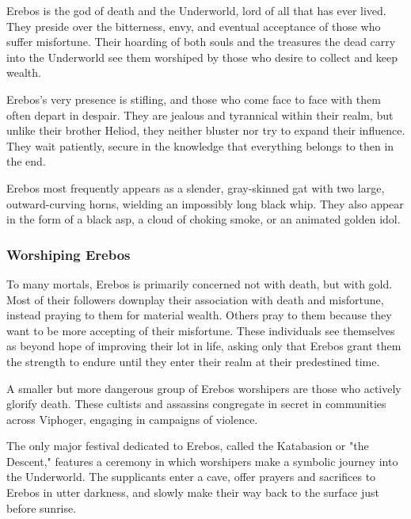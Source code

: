     Erebos is the god of death and the Underworld, lord of all that has ever lived.
    They preside over the bitterness, envy, and eventual acceptance of those who suffer misfortune.
    Their hoarding of both souls and the treasures the dead carry into the Underworld see them worshiped by those who desire to collect and keep wealth.

    Erebos's very presence is stifling, and those who come face to face with them often depart in despair.
    They are jealous and tyrannical within their realm, but unlike their brother Heliod, they neither bluster nor try to expand their influence.
    They wait patiently, secure in the knowledge that everything belongs to then in the end.

    Erebos most frequently appears as a slender, gray-skinned gat with two large, outward-curving horns, wielding an impossibly long black whip.
    They also appear in the form of a black asp, a cloud of choking smoke, or an animated golden idol.

    \subsubsection{Worshiping Erebos}
        To many mortals, Erebos is primarily concerned not with death, but with gold.
        Most of their followers downplay their association with death and misfortune, instead praying to them for material wealth.
        Others pray to them because they want to be more accepting of their misfortune.
        These individuals see themselves as beyond hope of improving their lot in life, asking only that Erebos grant them the strength to endure until they enter their realm at their predestined time.

        A smaller but more dangerous group of Erebos worshipers are those who actively glorify death.
        These cultists and assassins congregate in secret in communities across Viphoger, engaging in campaigns of violence.

        The only major festival dedicated to Erebos, called the Katabasion or "the Descent," features a ceremony in which worshipers make a symbolic journey into the Underworld.
        The supplicants enter a cave, offer prayers and sacrifices to Erebos in utter darkness, and slowly make their way back to the surface just before sunrise.
